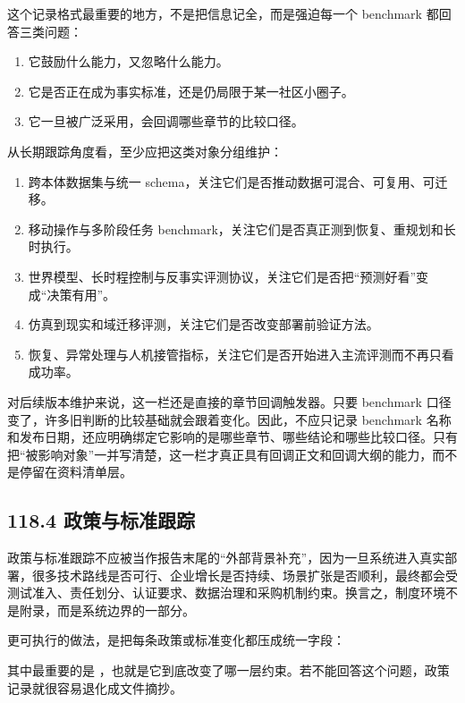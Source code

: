 这个记录格式最重要的地方，不是把信息记全，而是强迫每一个 benchmark 都回答三类问题：

\begin{enumerate}
\item 它鼓励什么能力，又忽略什么能力。
\item 它是否正在成为事实标准，还是仍局限于某一社区小圈子。
\item 它一旦被广泛采用，会回调哪些章节的比较口径。
\end{enumerate}

从长期跟踪角度看，至少应把这类对象分组维护：

\begin{enumerate}
\item 跨本体数据集与统一 schema，关注它们是否推动数据可混合、可复用、可迁移。
\item 移动操作与多阶段任务 benchmark，关注它们是否真正测到恢复、重规划和长时执行。
\item 世界模型、长时程控制与反事实评测协议，关注它们是否把“预测好看”变成“决策有用”。
\item 仿真到现实和域迁移评测，关注它们是否改变部署前验证方法。
\item 恢复、异常处理与人机接管指标，关注它们是否开始进入主流评测而不再只看成功率。
\end{enumerate}

对后续版本维护来说，这一栏还是直接的章节回调触发器。只要 benchmark 口径变了，许多旧判断的比较基础就会跟着变化。因此，不应只记录 benchmark 名称和发布日期，还应明确绑定它影响的是哪些章节、哪些结论和哪些比较口径。只有把“被影响对象”一并写清楚，这一栏才真正具有回调正文和回调大纲的能力，而不是停留在资料清单层。

\subsection*{118.4 政策与标准跟踪}


政策与标准跟踪不应被当作报告末尾的“外部背景补充”，因为一旦系统进入真实部署，很多技术路线是否可行、企业增长是否持续、场景扩张是否顺利，最终都会受测试准入、责任划分、认证要求、数据治理和采购机制约束。换言之，制度环境不是附录，而是系统边界的一部分。

更可执行的做法，是把每条政策或标准变化都压成统一字段：

\texttt{}

其中最重要的是 \texttt{}，也就是它到底改变了哪一层约束。若不能回答这个问题，政策记录就很容易退化成文件摘抄。

